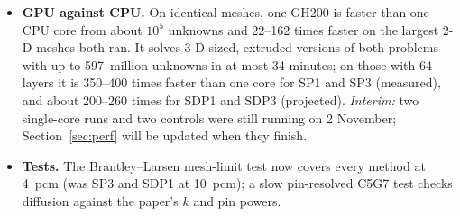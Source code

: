 \begin{itemize}
  their iteration cap on the finest 2-D meshes (GMRES from 1.6 million
  cells, CG at 6.6 million).
\item \textbf{GPU against CPU.} On identical meshes, one GH200 is faster
  than one CPU core from about $10^5$ unknowns and 22--162 times faster on the
  largest 2-D meshes both ran. It solves 3-D-sized, extruded versions of both
  problems with up to 597~million unknowns in at most 34 minutes; on those
  with 64 layers it is 350--400 times faster than one core for SP1 and SP3
  (measured), and about 200--260 times for SDP1 and SDP3 (projected).
  \emph{Interim:} two single-core runs and two controls were still running
  on 2 November; Section~\ref{sec:perf} will be updated when they finish.
\item \textbf{Tests.} The Brantley--Larsen mesh-limit test now covers every
  method at 4~pcm (was SP3 and SDP1 at 10~pcm); a slow pin-resolved C5G7
  test checks diffusion against the paper's $k$ and pin powers.
\end{itemize}
